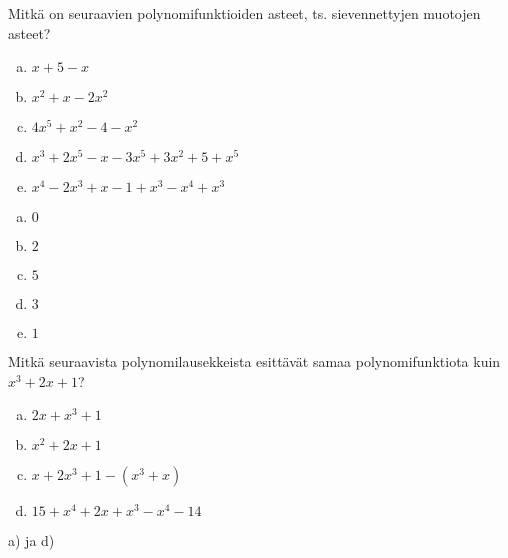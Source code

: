 \begin{tehtava}
	Mitkä on seuraavien polynomifunktioiden asteet, ts. sievennettyjen muotojen asteet?
	\begin{enumerate}[a)]
		\item $x+5-x$
		\item $x^2+x-2x^2$
		\item $4x^5+x^2-4-x^2$
		\item $x^3+2x^5-x-3x^5+3x^2+5+x^5$
		\item $x^4-2x^3+x-1+x^3-x^4+x^3$
	\end{enumerate}

	\begin{vastaus}
		\begin{enumerate}[a)]
			\item $0$
			\item $2$
			\item $5$
			\item $3$
			\item $1$
		\end{enumerate}
	\end{vastaus}
\end{tehtava}

%

\begin{tehtava}
	Mitkä seuraavista polynomilausekkeista esittävät samaa polynomifunktiota kuin
	$x^3+2x+1$?
	\begin{enumerate}[a)]
		\item $2x+x^3+1$
		\item $x^2+2x+1$
		\item $x+2x^3+1 - (x^3+x)$
		\item $15+x^4+2x+x^3-x^4-14$
	\end{enumerate}
	\begin{vastaus}
		a) ja d)
	\end{vastaus}
\end{tehtava}

